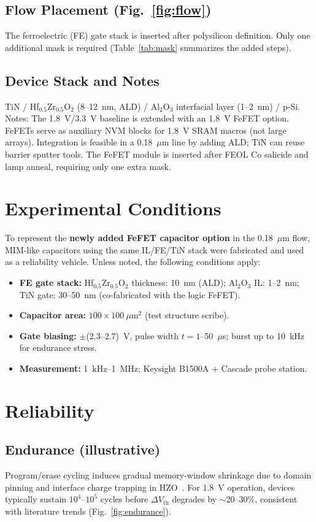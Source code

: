 \documentclass[conference]{IEEEtran}
\begin{document}
\subsection{Flow Placement (Fig.~\ref{fig:flow})}
The ferroelectric (FE) gate stack is inserted after polysilicon definition. Only one additional mask is required (Table~\ref{tab:mask} summarizes the added steps).

\subsection{Device Stack and Notes}
TiN / Hf$_{0.5}$Zr$_{0.5}$O$_2$ (8--12~nm, ALD) / Al$_2$O$_3$ interfacial layer (1--2~nm) / p-Si. Notes: The 1.8~V/3.3~V baseline is extended with an 1.8~V FeFET option. FeFETs serve as auxiliary NVM blocks for 1.8~V SRAM macros (not large arrays). Integration is feasible in a 0.18~$\mu$m line by adding ALD; TiN can reuse barrier sputter tools. The FeFET module is inserted after FEOL Co salicide and lamp anneal, requiring only one extra mask.

\section{Experimental Conditions}
To represent the \textbf{newly added FeFET capacitor option} in the 0.18~$\mu$m flow, MIM-like capacitors using the same IL/FE/TiN stack were fabricated and used as a reliability vehicle. Unless noted, the following conditions apply:
\begin{itemize}
  \item \textbf{FE gate stack:} Hf$_{0.5}$Zr$_{0.5}$O$_2$ thickness: 10~nm (ALD); Al$_2$O$_3$ IL: 1--2~nm; TiN gate: 30--50~nm (co-fabricated with the logic FeFET).
  \item \textbf{Capacitor area:} $100 \times 100~\mu$m$^2$ (test structure scribe).
  \item \textbf{Gate biasing:} $\pm$(2.3--2.7)~V, pulse width $t = 1$--50~$\mu$s; burst up to 10~kHz for endurance stress.
  \item \textbf{Measurement:} 1~kHz--1~MHz; Keysight B1500A + Cascade probe station.
\end{itemize}

\section{Reliability}
\subsection{Endurance (illustrative)}
Program/erase cycling induces gradual memory-window shrinkage due to domain pinning and interface charge trapping in HZO~\cite{Boscke2011,Mueller2012}. For 1.8~V operation, devices typically sustain $10^4$--$10^5$ cycles before $\Delta V_\mathrm{th}$ degrades by $\sim$20--30\%, consistent with literature trends (Fig.~\ref{fig:endurance}).
\end{document}
